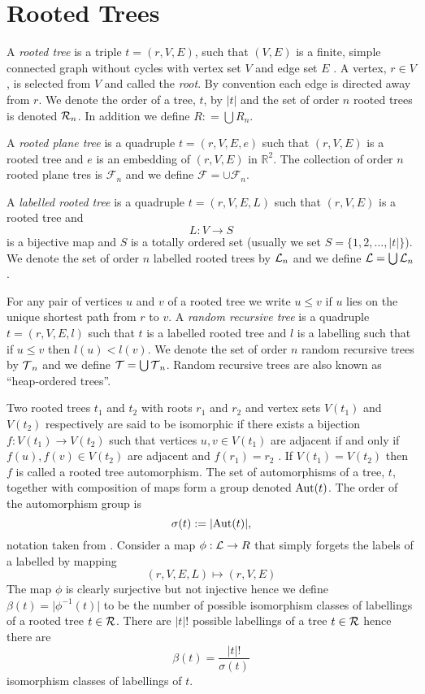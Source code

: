 \section{Rooted Trees}\label{sec:RootedTrees}
 A \emph{rooted tree} is a triple $t = (r,V,E)$, such that $(V,E)$ is a finite, simple connected graph without cycles with 
 vertex set $V$ and edge set $E$ \cite{tucker}. A vertex, $r \in V$, is selected from $V$ and called the \emph{root}. By convention each edge is directed away from $r$.  We denote the
 order of a tree, $t$, by $\lvert t \rvert$ and the set of order $n$ rooted trees is denoted $\operatorname{\mathcal{R}}_n$.  In addition we define 
 $R : = \bigcup R_n$.
 
 A \emph{rooted plane tree} is a quadruple $t=(r,V,E,e)$ such that $(r,V,E)$ is a rooted tree and $e$ is an embedding of $(r,V,E)$ 
 in $\mathbb{R}^2$.  The collection of order $n$ rooted plane tres is $\mathcal{F}_n$ and we define $\mathcal{F} = \cup\mathcal{F}_n$.  
 
 A \emph{labelled rooted tree} is a quadruple $t = (r,V,E,L)$ such that $(r,V,E)$ is a rooted tree and 
 \[L: V \longrightarrow S\] 
is a bijective map and $S$ is a totally ordered set (usually we set $S = \{1,2,\dots,\lvert t \rvert\}$).  We denote the set of order $n$ labelled rooted trees by $\operatorname{\mathcal{L}}_n$ and we define $\operatorname{\mathcal{L}} = \bigcup \operatorname{\mathcal{L}}_n$.      

For any pair of vertices $u$ and $v$ of a rooted tree we write $u \leq v$ if $u$ lies on the unique shortest path from $r$ to $v$.  A 
\emph{random recursive tree} is a quadruple $t = (r,V,E,l)$ such that $t$ is a labelled rooted tree and $l$ is a labelling 
such that if $u \leq v$ then $l(u) < l(v)$. 
We denote the set of order $n$ random recursive trees by $\operatorname{\mathcal{T}}_n$ and we define $\operatorname{\mathcal{T}} = \bigcup \operatorname{\mathcal{T}}_n$. Random recursive trees are also 
known as ``heap-ordered trees''.  

Two rooted trees $t_1$ and $t_2$ with roots $r_1$ and $r_2$ and vertex sets $V(t_1)$ and $V(t_2)$ respectively are said to be
isomorphic if there exists a bijection $f: V(t_1) \rightarrow V(t_2)$ such that 
vertices $u,v \in V(t_1)$ are adjacent if and only if $f(u),f(v) \in V(t_2)$ are adjacent and $f(r_1) = r_2$ \cite{harary}. If 
$V(t_1) = V(t_2)$ then $f$ is called a rooted tree automorphism.  The set of automorphisms of a tree, $t$, together with 
composition of maps form a group denoted $\operatorname{Aut}(t)$.  The order of the automorphism group is 
\[\sigma(t) := \lvert \operatorname{Aut}(t) \rvert,\]
notation taken from \cite{Butcher2008}. 
Consider a map $\phi: \operatorname{\mathcal{L}} \rightarrow R$ that simply forgets the labels of a labelled by mapping
\[
 (r,V,E,L) \mapsto (r,V,E)
\]
The map $\phi$ is clearly surjective but not injective hence we define $\beta(t) = \lvert \phi^{-1}(t) \rvert$ to be the number of
possible isomorphism classes of labellings of a rooted tree $t \in \operatorname{\mathcal{R}}$. There are $\lvert t \rvert !$ possible labellings of a tree 
$t \in \operatorname{\mathcal{R}}$ hence there are  
\begin{equation}\label{eq:1}
  \beta(t) = \frac{\lvert t \rvert !}{\sigma(t)} 
\end{equation}
isomorphism classes of labellings of $t$.  

